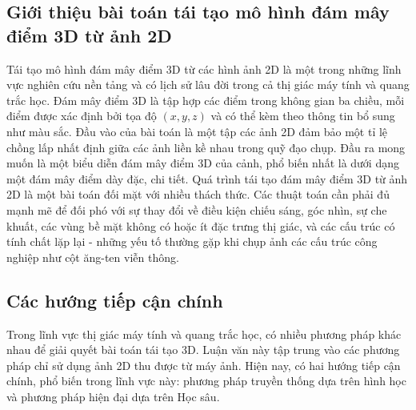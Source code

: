 \subsection{Giới thiệu bài toán tái tạo mô hình đám mây điểm 3D từ ảnh 2D}
\label{subsec:gioi_thieu_bai_toan}
Tái tạo mô hình đám mây điểm 3D từ các hình ảnh 2D là một trong những lĩnh vực nghiên cứu nền tảng và có lịch sử lâu đời trong cả thị giác máy tính và quang trắc học. Đám mây điểm 3D là tập hợp các điểm trong không gian ba chiều, mỗi điểm được xác định bởi tọa độ $(x, y, z)$ và có thể kèm theo thông tin bổ sung như màu sắc. Đầu vào của bài toán là một tập các ảnh 2D đảm bảo một tỉ lệ chồng lấp nhất định giữa các ảnh liền kề nhau trong quỹ đạo chụp. Đầu ra mong muốn là một biểu diễn đám mây điểm 3D của cảnh, phổ biến nhất là dưới dạng một đám mây điểm dày đặc, chi tiết. Quá trình tái tạo đám mây điểm 3D từ ảnh 2D là một bài toán đối mặt với nhiều thách thức. Các thuật toán cần phải đủ mạnh mẽ để đối phó với sự thay đổi về điều kiện chiếu sáng, góc nhìn, sự che khuất, các vùng bề mặt không có hoặc ít đặc trưng thị giác, và các cấu trúc có tính chất lặp lại - những yếu tố thường gặp khi chụp ảnh các cấu trúc công nghiệp như cột ăng-ten viễn thông.

\subsection{Các hướng tiếp cận chính}
\label{subsec:huong_tiep_can}
Trong lĩnh vực thị giác máy tính và quang trắc học, có nhiều phương pháp khác nhau để giải quyết bài toán tái tạo 3D. Luận văn này tập trung vào các phương pháp chỉ sử dụng ảnh 2D thu được từ máy ảnh. Hiện nay, có hai hướng tiếp cận chính, phổ biến trong lĩnh vực này: phương pháp truyền thống dựa trên hình học và phương pháp hiện đại dựa trên Học sâu.

